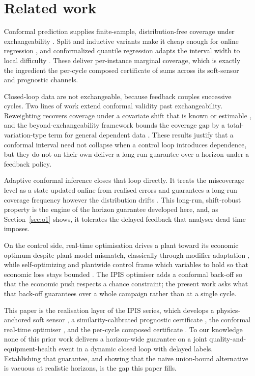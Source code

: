 \documentclass[review,12pt]{elsarticle}
\begin{document}
\section{Related work}
\label{sec:related}

Conformal prediction supplies finite-sample, distribution-free coverage under exchangeability
\citep{vovk2005, shafer2008}. Split and inductive variants make it cheap enough for online
regression \citep{lei2018, angelopoulos2023}, and conformalized quantile regression adapts the
interval width to local difficulty \citep{romano2019}. These deliver per-instance marginal
coverage, which is exactly the ingredient the per-cycle composed certificate of
\citet{busico_m4} sums across its soft-sensor and prognostic channels.

Closed-loop data are not exchangeable, because feedback couples successive cycles. Two lines of
work extend conformal validity past exchangeability. Reweighting recovers coverage under a
covariate shift that is known or estimable \citep{tibshirani2019}, and the
beyond-exchangeability framework bounds the coverage gap by a total-variation-type term for
general dependent data \citep{barber2023}. These results justify that a conformal interval need
not collapse when a control loop introduces dependence, but they do not on their own deliver a
long-run guarantee over a horizon under a feedback policy.

Adaptive conformal inference closes that loop directly. It treats the miscoverage level as a
state updated online from realised errors and guarantees a long-run coverage frequency however
the distribution drifts \citep{gibbs2021}. This long-run, shift-robust property is the engine of
the horizon guarantee developed here, and, as Section~\ref{sec:o1} shows, it tolerates the
delayed feedback that analyser dead time imposes.

On the control side, real-time optimisation drives a plant toward its economic optimum despite
plant-model mismatch, classically through modifier adaptation
\citep{marchetti2009, chachuat2009}, while self-optimizing and plantwide control frame which
variables to hold so that economic loss stays bounded \citep{skogestad2000}. The IPIS optimiser
\citep{busico_m3} adds a conformal back-off so that the economic push respects a chance
constraint; the present work asks what that back-off guarantees over a whole campaign rather
than at a single cycle.

This paper is the realisation layer of the IPIS series, which develops a physics-anchored soft
sensor \citep{busico_m1}, a similarity-calibrated prognostic certificate \citep{busico_m2}, the
conformal real-time optimiser \citep{busico_m3}, and the per-cycle composed certificate
\citep{busico_m4}. To our knowledge none of this prior work delivers a horizon-wide guarantee on
a joint quality-and-equipment-health event in a dynamic closed loop with delayed labels.
Establishing that guarantee, and showing that the naive union-bound alternative is vacuous at
realistic horizons, is the gap this paper fills.
\end{document}
